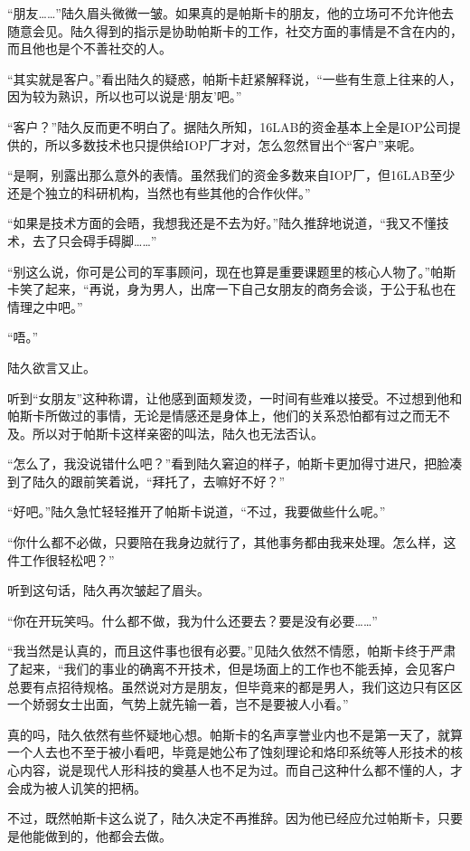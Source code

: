 “朋友……”陆久眉头微微一皱。如果真的是帕斯卡的朋友，他的立场可不允许他去随意会见。陆久得到的指示是协助帕斯卡的工作，社交方面的事情是不含在内的，而且他也是个不善社交的人。

“其实就是客户。”看出陆久的疑惑，帕斯卡赶紧解释说，“一些有生意上往来的人，因为较为熟识，所以也可以说是‘朋友’吧。”

“客户？”陆久反而更不明白了。据陆久所知，16LAB的资金基本上全是IOP公司提供的，所以多数技术也只提供给IOP厂才对，怎么忽然冒出个“客户”来呢。

“是啊，别露出那么意外的表情。虽然我们的资金多数来自IOP厂，但16LAB至少还是个独立的科研机构，当然也有些其他的合作伙伴。”

“如果是技术方面的会晤，我想我还是不去为好。”陆久推辞地说道，“我又不懂技术，去了只会碍手碍脚……”

“别这么说，你可是公司的军事顾问，现在也算是重要课题里的核心人物了。”帕斯卡笑了起来，“再说，身为男人，出席一下自己女朋友的商务会谈，于公于私也在情理之中吧。”

“唔。”

陆久欲言又止。

听到“女朋友”这种称谓，让他感到面颊发烫，一时间有些难以接受。不过想到他和帕斯卡所做过的事情，无论是情感还是身体上，他们的关系恐怕都有过之而无不及。所以对于帕斯卡这样亲密的叫法，陆久也无法否认。

“怎么了，我没说错什么吧？”看到陆久窘迫的样子，帕斯卡更加得寸进尺，把脸凑到了陆久的跟前笑着说，“拜托了，去嘛好不好？”

“好吧。”陆久急忙轻轻推开了帕斯卡说道，“不过，我要做些什么呢。”

“你什么都不必做，只要陪在我身边就行了，其他事务都由我来处理。怎么样，这件工作很轻松吧？”

听到这句话，陆久再次皱起了眉头。

“你在开玩笑吗。什么都不做，我为什么还要去？要是没有必要……”

“我当然是认真的，而且这件事也很有必要。”见陆久依然不情愿，帕斯卡终于严肃了起来，“我们的事业的确离不开技术，但是场面上的工作也不能丢掉，会见客户总要有点招待规格。虽然说对方是朋友，但毕竟来的都是男人，我们这边只有区区一个娇弱女士出面，气势上就先输一着，岂不是要被人小看。”

真的吗，陆久依然有些怀疑地心想。帕斯卡的名声享誉业内也不是第一天了，就算一个人去也不至于被小看吧，毕竟是她公布了蚀刻理论和烙印系统等人形技术的核心内容，说是现代人形科技的奠基人也不足为过。而自己这种什么都不懂的人，才会成为被人讥笑的把柄。

不过，既然帕斯卡这么说了，陆久决定不再推辞。因为他已经应允过帕斯卡，只要是他能做到的，他都会去做。

